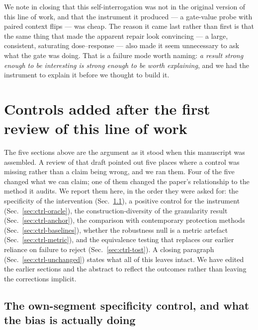 \documentclass[review,12pt,number]{elsarticle}
\begin{document}
We note in closing that this self-interrogation was not in the original
version of this line of work, and that the instrument it produced --- a
gate-value probe with paired context flips --- was cheap. The reason it
came last rather than first is that the same thing that made the
apparent repair look convincing --- a large, consistent, saturating
dose--response --- also made it seem unnecessary to ask what the gate was
doing. That is a failure mode worth naming: \emph{a result strong enough
to be interesting is strong enough to be worth explaining}, and we had
the instrument to explain it before we thought to build it.





\section{Controls added after the first review of this line of work}
\label{sec:controls}

The five sections above are the argument as it stood when this manuscript
was assembled. A review of that draft pointed out five places where a
control was missing rather than a claim being wrong, and we ran them. Four
of the five changed what we can claim; one of them changed the paper's
relationship to the method it audits. We report them here, in the order
they were asked for: the specificity of the intervention
(Sec.~\ref{sec:ctrl-specificity}), a positive control for the instrument
(Sec.~\ref{sec:ctrl-oracle}), the construction-diversity of the
granularity result (Sec.~\ref{sec:ctrl-anchor}), the comparison with
contemporary protection methods (Sec.~\ref{sec:ctrl-baselines}), whether
the robustness null is a metric artefact (Sec.~\ref{sec:ctrl-metric}), and
the equivalence testing that replaces our earlier reliance on failure to
reject (Sec.~\ref{sec:ctrl-tost}). A closing paragraph
(Sec.~\ref{sec:ctrl-unchanged}) states what all of this leaves intact. We
have edited the earlier sections and the abstract to reflect the outcomes
rather than leaving the corrections implicit.

\subsection{The own-segment specificity control, and what the bias is
actually doing}
\label{sec:ctrl-specificity}
\end{document}
